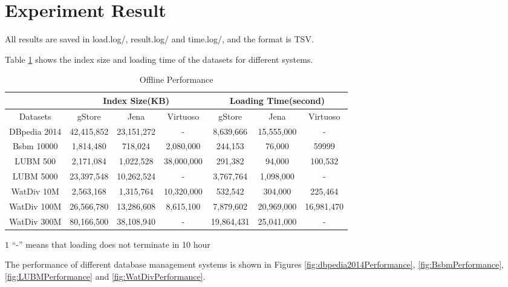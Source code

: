 \documentclass[titlepage, a4paper, 12pt] {article}
\begin{document}
\clearpage

\section{Experiment Result}

All results are saved in load.log/, result.log/ and time.log/, and the format is TSV. 

Table \ref{table:loading} shows the index size and loading time of the datasets
for different systems.

\begin{table}[htcp]
	\small
	\begin{threeparttable}
		\begin{tabular}{|c||c|c|c||c|c|c|}
			\hline
			& \multicolumn{3}{c||}{Index Size(KB)}& \multicolumn{3}{c|}{Loading Time(second)}\\
			\hline
			\hline
			Datasets & gStore & Jena& Virtuoso& gStore & Jena& Virtuoso\\
			\hline
			DBpedia 2014 & 42,415,852&	23,151,272 &	-\tnote{$1$} & 8,639,666	&15,555,000	& -	\\
			\hline
			Bsbm 10000 & 1,814,480 & 718,024 & 2,080,000 & 244,153 & 76,000 & 59999  \\
			\hline
			LUBM 500  &2,171,084 &1,022,528	&	38,000,000 &	291,382&	94,000 &100,532	 \\
			\hline
			LUBM 5000 & 23,397,548&	10,262,524	 &	- & 3,767,764	&1,098,000  &	- \\
			\hline
			WatDiv 10M & 2,563,168&	1,315,764	 &	10,320,000 & 532,542	&304,000	&225,464 \\
			\hline
			WatDiv 100M & 26,566,780&	13,286,608	 &	8,615,100 & 7,879,602	&20,969,000	&16,981,470 \\
			\hline
			WatDiv 300M & 80,166,500&	38,108,940	 &	- & 19,864,431	&25,041,000 &	- \\
			\hline
		\end{tabular}
		\begin{tablenotes}
			\small
		\item[$1$] ``-'' means that loading does not terminate in 10 hour
		\end{tablenotes}
	\end{threeparttable}
	\caption{Offline Performance}
	\label{table:loading}
\end{table}

The performance of different database management systems is shown in Figures \ref{fig:dbpedia2014Performance}, \ref{fig:BsbmPerformance}, \ref{fig:LUBMPerformance} and \ref{fig:WatDivPerformance}.
\end{document}
